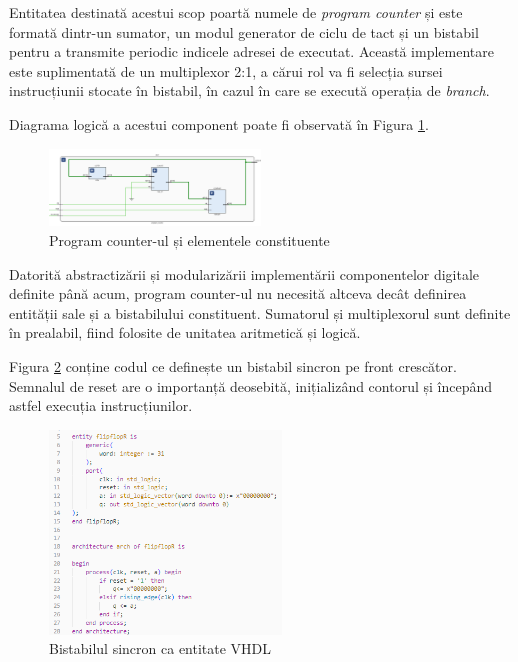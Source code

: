 \documentclass[12pt]{article}
\begin{document}
Entitatea destinată acestui scop poartă numele de \textit{program counter} și este formată dintr-un sumator, un modul generator de ciclu de tact și un bistabil pentru a transmite periodic indicele adresei de executat. Această implementare este suplimentată de un multiplexor 2:1, a cărui rol va fi selecția sursei instrucțiunii stocate în bistabil, în cazul în care se execută operația de  \textit{branch}.

Diagrama logică a acestui component poate fi observată în Figura \ref{Figura:36}.

 \begin{figure}[h!]
 \includegraphics[width=0.5\textwidth]{programcounter.png}
 \centering
 \caption{Program counter-ul și elementele constituente}
 \label{Figura:36}
 \end{figure}

 Datorită abstractizării și modularizării implementării componentelor digitale definite până acum, program counter-ul nu necesită altceva decât definirea entității sale și a bistabilului constituent. Sumatorul și multiplexorul sunt definite în prealabil, fiind folosite de unitatea aritmetică și logică.
 
Figura  \ref{Figura:37} conține codul ce definește un bistabil sincron pe front crescător. Semnalul de reset are o importanță deosebită, inițializând contorul și începând astfel execuția instrucțiunilor.
  \begin{figure}[h!]
 \includegraphics[width=0.55\textwidth]{bistabilcode.png}
 \centering
 \caption{Bistabilul sincron ca entitate VHDL}
 \label{Figura:37}
 \end{figure}
\end{document}
